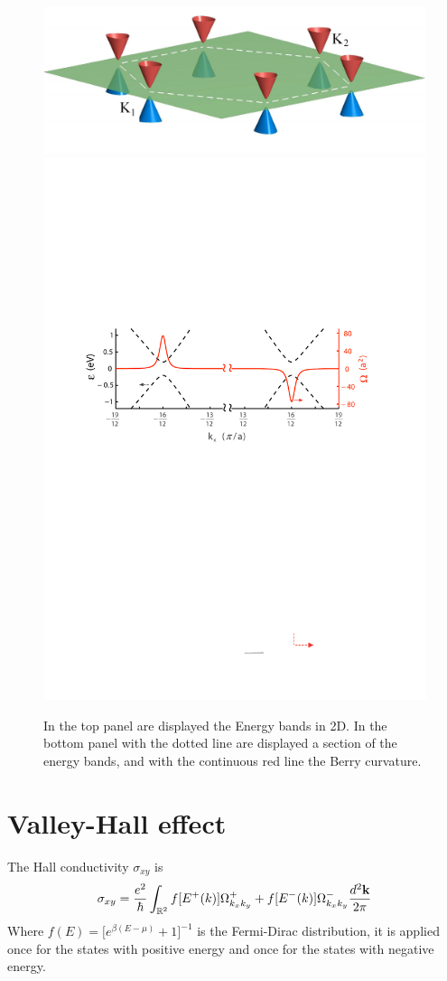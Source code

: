 \begin{figure}
    \centering
    \includegraphics[width=0.7\linewidth]{Immagini/ValleyHall/band_graphene.pdf}
    \includegraphics[width=0.7\linewidth]{Immagini/ValleyHall/curvature_graphene.pdf}
    \caption{In the top panel are displayed the Energy bands in 2D. In the bottom panel with the dotted line are displayed a section of the energy bands, and with the continuous red line the Berry curvature.}
    \label{fig:cones}
\end{figure}









 

\section{Valley-Hall effect}
The Hall conductivity $\sigma_{xy}$ is 
\begin{equation}
    \sigma_{xy}=\frac{e^2}\hbar \int_{\mathbb R^2} f[E^+(k)]\Omega^+_{k_xk_y}+f[E^-(k)]\Omega^-_{k_xk_y}\frac{d^2\mathbf{k}}{2\pi}
    \label{eq:valley-conductivity-1}
\end{equation}
Where $f(E)=\big[e^{\beta (E-\mu)}+1\big]^{-1}$ is the Fermi-Dirac distribution, it is applied once for the states with positive energy and once for the states with negative energy.

